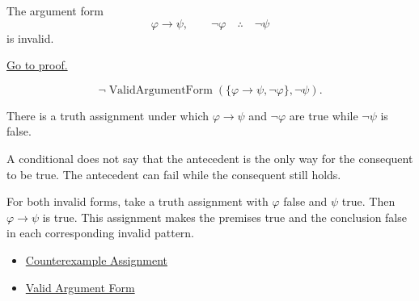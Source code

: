 \begin{tcolorbox}[colback=thmbox, colframe=thmborder, arc=2pt,
  left=6pt, right=6pt, top=4pt, bottom=4pt,
  title={\small\textbf{Theorem (Denying the Antecedent is Invalid)}},
  fonttitle=\small\bfseries]
\begin{theorem}
\label{thm:denying-antecedent-invalid-propositional-logic}
The argument form
\[
\varphi\to\psi,\qquad \neg\varphi \quad\therefore\quad \neg\psi
\]
is invalid.

\noindent\hyperref[prf:denying-antecedent-invalid-propositional-logic]{Go to proof.}
\end{theorem}
\end{tcolorbox}

\begin{remark*}
\[
\neg\operatorname{ValidArgumentForm}(\{\varphi\to\psi,\neg\varphi\},\neg\psi).
\]
\end{remark*}

\begin{remark*}
There is a truth assignment under which \(\varphi\to\psi\) and \(\neg\varphi\)
are true while \(\neg\psi\) is false.
\end{remark*}

\begin{remark*}[Interpretation]
A conditional does not say that the antecedent is the only way for the consequent
to be true. The antecedent can fail while the consequent still holds.
\end{remark*}

\begin{remark*}[Exposition]
For both invalid forms, take a truth assignment with \(\varphi\) false and
\(\psi\) true. Then \(\varphi\to\psi\) is true. This assignment makes the
premises true and the conclusion false in each corresponding invalid pattern.
\end{remark*}

\begin{dependencies}
\begin{itemize}
  \item \hyperref[def:counterexample-assignment-propositional-logic]{Counterexample Assignment}
  \item \hyperref[def:valid-argument-form-propositional-logic]{Valid Argument Form}
\end{itemize}
\end{dependencies}
